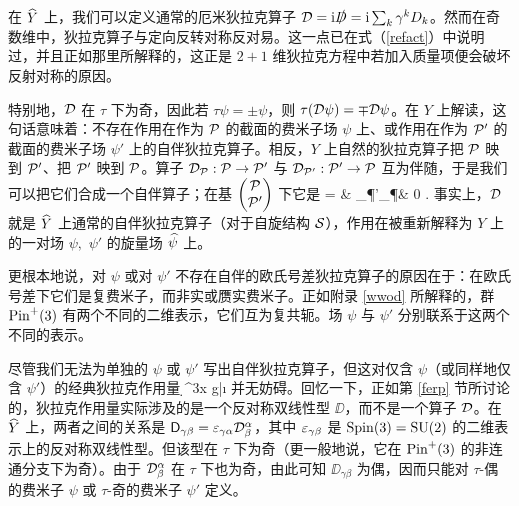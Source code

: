 在 $\h Y$ 上，我们可以定义通常的厄米狄拉克算子 $\D=\i\slashed{D}=\i\sum_k\g^k D_k$。然而在奇数维中，狄拉克算子与定向反转对称反对易。这一点已在式（\ref{refact}）中说明过，并且正如那里所解释的，这正是 $2+1$ 维狄拉克方程中若加入质量项便会破坏反射对称的原因。


特别地，$\D$ 在 $\tau$ 下为奇，因此若 $\tau\psi=\pm\psi$，则 $\tau(\D\psi)=\mp\D\psi$。在 $Y$ 上解读，这句话意味着：不存在作用在作为 $\P$ 的截面的费米子场 $\psi$ 上、或作用在作为 $\P'$ 的截面的费米子场 $\psi'$ 上的自伴狄拉克算子。相反，$Y$ 上自然的狄拉克算子把 $\P$ 映到 $\P'$、把 $\P'$ 映到 $\P$。算子 $\D_\P:\P\to \P'$ 与 $\D_{\P'}:\P'\to \P$ 互为伴随，于是我们可以把它们合成一个自伴算子；在基 $\bp \P\cr \P'\ep$ 下它是
\be\label{intr}\D= & \D_{\P'}\cr \D_\P & 0 \ep. \ee
事实上，$\D$ 就是 $\h Y$ 上通常的自伴狄拉克算子（对于自旋结构 $\S$），作用在被重新解释为 $Y$ 上的一对场 $\psi, $ $\psi'$ 的旋量场 $\h\psi$ 上。


更根本地说，对 $\psi$ 或对 $\psi'$ 不存在自伴的欧氏号差狄拉克算子的原因在于：在欧氏号差下它们是复费米子，而非实或赝实费米子。正如附录 \ref{wwod} 所解释的，群 $\Pin^+(3)$ 有两个不同的二维表示，它们互为复共轭。场 $\psi$ 与 $\psi'$ 分别联系于这两个不同的表示。

尽管我们无法为单独的 $\psi$ 或 $\psi'$ 写出自伴狄拉克算子，但这对仅含 $\psi$（或同样地仅含 $\psi'$）的经典狄拉克作用量
\be\label{terb}\int\d^3x \sqrt g\bar\psi\i{}\psi \ee
并无妨碍。回忆一下，正如第 \ref{ferp} 节所讨论的，狄拉克作用量实际涉及的是一个反对称双线性型 $\DD$，而不是一个算子 $\D$。在 $\h Y$ 上，两者之间的关系是 $\DD_{\gamma\beta}=\veps_{\gamma\alpha}\D^\alpha_\beta$，其中 $\veps_{\gamma\beta}$ 是 $\Spin(3)=\SU(2)$ 的二维表示上的反对称双线性型。但该型在 $\tau$ 下为奇（更一般地说，它在 $\Pin^+(3)$ 的非连通分支下为奇）。由于 $\D^\alpha_\beta$ 在 $\tau$ 下也为奇，由此可知 $\DD_{\gamma\beta}$ 为偶，因而只能对 $\tau$-偶的费米子 $\psi$ 或 $\tau$-奇的费米子 $\psi'$ 定义。


